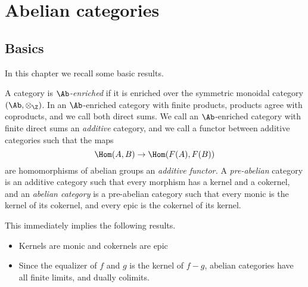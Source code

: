\documentclass[main.tex]{subfiles}
\begin{document}
\chapter{Abelian categories}
\label{ch:abelian_categories}

\section{Basics}
\label{sec:basics}

In this chapter we recall some basic results.

A category is \emph{$\Ab$-enriched} if it is enriched over the symmetric monoidal category $(\Ab, \otimes_{\Z})$. In an $\Ab$-enriched category with finite products, products agree with coproducts, and we call both direct sums. We call an $\Ab$-enriched category with finite direct sums an \emph{additive} category, and we call a functor between additive categories such that the maps
\begin{equation*}
  \Hom(A, B) \to \Hom(F(A), F(B))
\end{equation*}
are homomorphisms of abelian groups an \emph{additive functor.} A \emph{pre-abelian} category is an additive category such that every morphism has a kernel and a cokernel, and an \emph{abelian category} is a pre-abelian category such that every monic is the kernel of its cokernel, and every epic is the cokernel of its kernel.

This immediately implies the following results.
\begin{itemize}
  \item Kernels are monic and cokernels are epic

  \item Since the equalizer of $f$ and $g$ is the kernel of $f-g$, abelian categories have all finite limits, and dually colimits.
\end{itemize}
\end{document}
